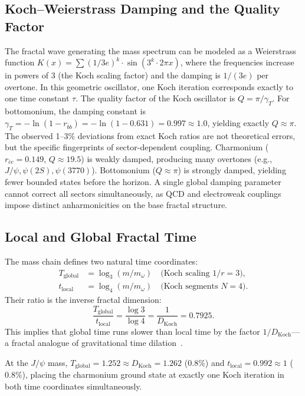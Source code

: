 \documentclass[twocolumn,showpacs,preprintnumbers,amsmath,amssymb,prl]{revtex4-2}
\begin{document}
\subsection{Koch--Weierstrass Damping and the Quality Factor}

The fractal wave generating the mass spectrum can be modeled as a Weierstrass
function $K(x) = \sum (1/3e)^k \cdot \sin(3^k \cdot 2\pi x)$, where the frequencies
increase in powers of 3 (the Koch scaling factor) and the damping is
$1/(3e)$ per overtone. In this geometric oscillator, one Koch iteration
corresponds exactly to one time constant $\tau$.
The quality factor of the Koch oscillator is $Q = \pi / \gamma_T$. For bottomonium,
the damping constant is $\gamma_T = -\ln(1 - r_{\bar{b}b}) = -\ln(1 - 0.631) = 0.997 \approx 1.0$,
yielding exactly $Q \approx \pi$.
The observed 1--3\% deviations from exact Koch ratios are not theoretical errors,
but the specific fingerprints of sector-dependent coupling. Charmonium ($r_{\bar{c}c}=0.149$,
$Q \approx 19.5$) is weakly damped, producing many overtones (e.g., $J/\psi, \psi(2S), \psi(3770)$).
Bottomonium ($Q \approx \pi$) is strongly damped, yielding fewer bounded states before the horizon.
A single global damping parameter cannot correct all sectors simultaneously, as
QCD and electroweak couplings impose distinct anharmonicities on the base fractal structure.

\subsection{Local and Global Fractal Time}

The mass chain defines two natural time coordinates:
\begin{align}
    T_{\text{global}} &= \log_3(m/m_\omega) \quad
        \text{(Koch scaling $1/r = 3$)}, \\
    t_{\text{local}} &= \log_4(m/m_\omega) \quad
        \text{(Koch segments $N = 4$)}.
\end{align}
Their ratio is the inverse fractal dimension:
\begin{equation}
    \frac{T_{\text{global}}}{t_{\text{local}}} = \frac{\log 3}{\log 4}
    = \frac{1}{D_{\text{Koch}}} = 0.7925.
    \label{eq:fractaltime}
\end{equation}
This implies that global time runs slower than local time by the factor
$1/D_{\text{Koch}}$---a fractal analogue of gravitational time
dilation~\cite{Pikovski2026,Bortolotti2026}.

At the $J/\psi$ mass, $T_{\text{global}} = 1.252 \approx D_{\text{Koch}} = 1.262$
($0.8\%$) and $t_{\text{local}} = 0.992 \approx 1$ ($0.8\%$), placing
the charmonium ground state at exactly one Koch iteration in both time
coordinates simultaneously.
\end{document}
